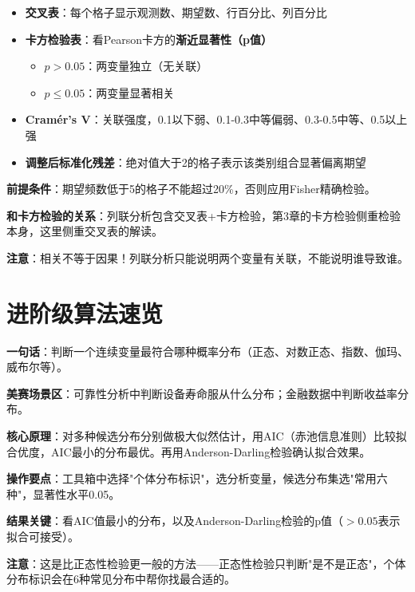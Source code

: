 \begin{algoresult}
\begin{itemize}
    \item \textbf{交叉表}：每个格子显示观测数、期望数、行百分比、列百分比
    \item \textbf{卡方检验表}：看Pearson卡方的\textbf{渐近显著性（p值）}
    \begin{itemize}
        \item $p > 0.05$：两变量独立（无关联）
        \item $p \leq 0.05$：两变量显著相关
    \end{itemize}
    \item \textbf{Cramér's V}：关联强度，0.1以下弱、0.1-0.3中等偏弱、0.3-0.5中等、0.5以上强
    \item \textbf{调整后标准化残差}：绝对值大于2的格子表示该类别组合显著偏离期望
\end{itemize}
\end{algoresult}

\begin{algonotes}
\textbf{前提条件}：期望频数低于5的格子不能超过20\%，否则应用Fisher精确检验。

\textbf{和卡方检验的关系}：列联分析包含交叉表+卡方检验，第3章的卡方检验侧重检验本身，这里侧重交叉表的解读。

\textbf{注意}：相关不等于因果！列联分析只能说明两个变量有关联，不能说明谁导致谁。
\end{algonotes}

\section{进阶级算法速览}


\begin{algobrief}
\textbf{一句话}：判断一个连续变量最符合哪种概率分布（正态、对数正态、指数、伽玛、威布尔等）。

\textbf{美赛场景区}：可靠性分析中判断设备寿命服从什么分布；金融数据中判断收益率分布。

\textbf{核心原理}：对多种候选分布分别做极大似然估计，用AIC（赤池信息准则）比较拟合优度，AIC最小的分布最优。再用Anderson-Darling检验确认拟合效果。

\textbf{操作要点}：工具箱中选择"个体分布标识"，选分析变量，候选分布集选"常用六种"，显著性水平0.05。

\textbf{结果关键}：看AIC值最小的分布，以及Anderson-Darling检验的p值（$>0.05$表示拟合可接受）。

\textbf{注意}：这是比正态性检验更一般的方法——正态性检验只判断"是不是正态"，个体分布标识会在6种常见分布中帮你找最合适的。
\end{algobrief}

